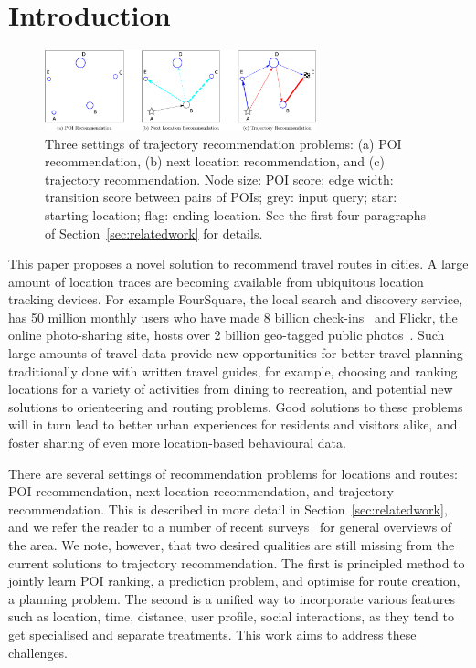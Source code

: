 
\section{Introduction}
\label{sec:intro}

\begin{figure}[ht]
	\centering
	\includegraphics[width=0.7\textwidth]{fig/fig1-flavours.pdf}
	\caption{Three settings of trajectory recommendation problems: (a) POI recommendation, (b) next location recommendation, and (c) trajectory recommendation. Node size: POI score; edge width: transition score between pairs of POIs; grey: input query; star: starting location; flag: ending location. See the first four paragraphs of Section~\ref{sec:relatedwork} for details.
}
	\label{fig:threesettings}
\end{figure}


This paper proposes a novel solution to recommend travel routes in cities.
A large amount of location traces are becoming available from ubiquitous location tracking devices.
For example FourSquare, the local search and discovery service, has 50 million monthly users who have made 8 billion check-ins~\cite{4sq}
and Flickr, the online photo-sharing site, hosts over 2 billion geo-tagged public photos~\cite{flickr}. 
Such large amounts of travel data provide new opportunities for better
travel planning traditionally done with written travel guides,
for example, choosing and ranking locations for a variety of activities from dining to recreation,
and potential new solutions to orienteering and routing problems.
Good solutions to these problems will in turn lead to better urban experiences for residents and visitors alike, and foster sharing of even more location-based behavioural data.

There are several settings of recommendation problems for locations and routes: POI recommendation,
next location recommendation, and trajectory recommendation. This is described in more detail in
Section~\ref{sec:relatedwork}, and we refer the reader to a number of recent
surveys~\cite{bao2015recommendations,zheng2015trajectory,zheng2014urban}
for general overviews of the area. %
We note, however, that two desired qualities are still 
missing from the current solutions to trajectory recommendation. 
The first is principled method to jointly learn POI ranking, a prediction problem, 
and optimise for route creation, a planning problem. 
The second is a unified way to incorporate various features 
such as location, time, distance, user profile, social interactions, 
as they tend to get specialised and separate treatments. 
This work aims to address these challenges. %

